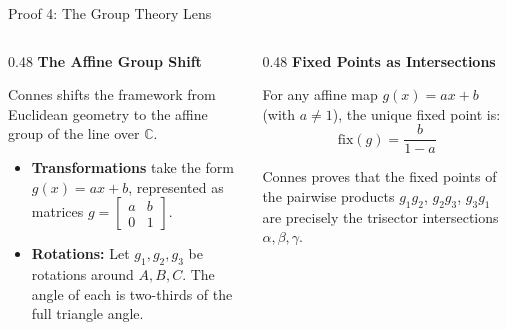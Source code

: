 \documentclass[aspectratio=169,10pt]{beamer}
\begin{document}
\begin{frame}{Proof 4: The Group Theory Lens}
\begin{columns}[T]
\begin{column}{0.48\textwidth}
\small
\textbf{The Affine Group Shift}
\vspace{0.1cm}

Connes shifts the framework from Euclidean geometry to the affine group of the line over $\mathbb{C}$.

\begin{itemize}\footnotesize
  \item \textbf{Transformations} take the form $g(x) = ax + b$, represented as matrices $g = \begin{bmatrix} a & b \\ 0 & 1 \end{bmatrix}$.
  \item \textbf{Rotations:} Let $g_1, g_2, g_3$ be rotations around $A, B, C$. The angle of each is two-thirds of the full triangle angle.
\end{itemize}
\end{column}
\begin{column}{0.48\textwidth}
\small
\textbf{Fixed Points as Intersections}
\vspace{0.1cm}

For any affine map $g(x) = ax + b$ (with $a \neq 1$), the unique fixed point is:
\[ \text{fix}(g) = \frac{b}{1-a} \]

Connes proves that the fixed points of the pairwise products $g_1g_2$, $g_2g_3$, $g_3g_1$ are precisely the trisector intersections $\alpha, \beta, \gamma$.
\end{column}
\end{columns}
\end{frame}
\end{document}
